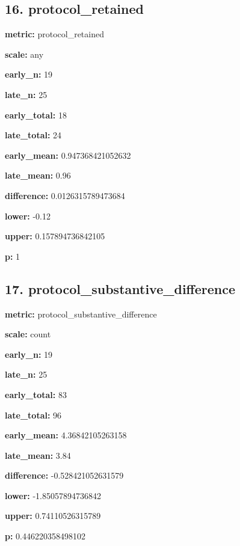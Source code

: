 \documentclass[10pt,a4paper]{article}
\begin{document}
\subsection*{16.\allowbreak{} protocol\_\allowbreak{}retained}
\textbf{metric:} protocol\_\allowbreak{}retained\par
\textbf{scale:} any\par
\textbf{early\_\allowbreak{}n:} 19\par
\textbf{late\_\allowbreak{}n:} 25\par
\textbf{early\_\allowbreak{}total:} 18\par
\textbf{late\_\allowbreak{}total:} 24\par
\textbf{early\_\allowbreak{}mean:} 0.\allowbreak{}947368421052632\par
\textbf{late\_\allowbreak{}mean:} 0.\allowbreak{}96\par
\textbf{difference:} 0.\allowbreak{}0126315789473684\par
\textbf{lower:} -\allowbreak{}0.\allowbreak{}12\par
\textbf{upper:} 0.\allowbreak{}157894736842105\par
\textbf{p:} 1\par
\subsection*{17.\allowbreak{} protocol\_\allowbreak{}substantive\_\allowbreak{}difference}
\textbf{metric:} protocol\_\allowbreak{}substantive\_\allowbreak{}difference\par
\textbf{scale:} count\par
\textbf{early\_\allowbreak{}n:} 19\par
\textbf{late\_\allowbreak{}n:} 25\par
\textbf{early\_\allowbreak{}total:} 83\par
\textbf{late\_\allowbreak{}total:} 96\par
\textbf{early\_\allowbreak{}mean:} 4.\allowbreak{}36842105263158\par
\textbf{late\_\allowbreak{}mean:} 3.\allowbreak{}84\par
\textbf{difference:} -\allowbreak{}0.\allowbreak{}528421052631579\par
\textbf{lower:} -\allowbreak{}1.\allowbreak{}85057894736842\par
\textbf{upper:} 0.\allowbreak{}74110526315789\par
\textbf{p:} 0.\allowbreak{}446220358498102\par
\end{document}
